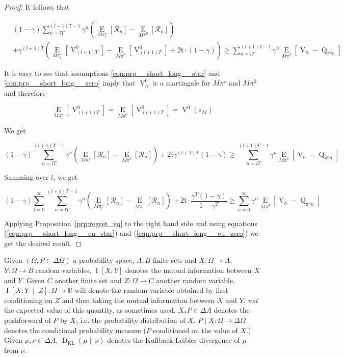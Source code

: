 \documentclass[anon,12pt]{colt2018} %
\newcommand{\Comment}[1]{}
\newcommand{\AP}[1]{\left(#1\right)}
\newcommand{\AB}[1]{\left[#1\right]}
\newcommand{\ABM}[2]{\left[#1\;\middle\vert\;#2\right]}
\newcommand{\Ea}[2]{\underset{#1}{\operatorname{E}}\AB{#2}}
\newcommand{\CI}[3]{\underset{#1}{\operatorname{I}}\ABM{#2}{#3}}
\newcommand{\Ia}[2]{\underset{#1}{\operatorname{I}}\AB{#2}}
\newcommand{\KL}[2]{\operatorname{D}_{\mathrm{KL}}(#1 \| #2)}
\newcommand{\Reals}{\mathbb{R}}
\newcommand{\R}{\mathcal{R}}
\newcommand{\V}{\operatorname{V}}
\newcommand{\Q}{\operatorname{Q}}
\newcommand{\Tn}{\mathfrak{t}}
\begin{document}
\begin{proof}
It follows that

\begin{align*}
&(1-\gamma)\sum_{n=lT}^{(l+1)T-1} {\gamma^n\AP{\Ea{M\pi^\star_l}{\R_n}-\Ea{M\pi^0}{\R_n}}}\\ 
&+ \gamma^{(l+1)T}\AP{\Ea{M\pi^\star_l}{\V^0_{(l+1)T}}-\Ea{M\pi^0}{\V^0_{(l+1)T}}+2\Tn\cdot(1-\gamma)} \geq \sum_{n=lT}^{(l+1)T-1}{\gamma^n \Ea{M\pi^0}{\V_n-\Q_{\pi^0n}}}
\end{align*}

\Comment{Here, an expected value w.r.t. the difference of two probability measures is understood to mean the corresponding difference of expected values.}

It is easy to see that assumptions \ref{con:prp__short_long__star} and \ref{con:prp__short_long__zero} imply that $\V_n^0$ is a martingale for $M\pi^\star$ and $M\pi^0$ and therefore

$$\Ea{M\pi^\star_l}{\V^0_{(l+1)T}}=\Ea{M\pi^0}{\V^0_{(l+1)T}}=\V^0\AP{s_M}$$

We get

\begin{equation*}
(1-\gamma)\sum_{n=lT}^{(l+1)T-1} {\gamma^n\AP{\Ea{M\pi^\star_l}{\R_n}-\Ea{M\pi^0}{\R_n}}}+ 2\Tn\gamma^{(l+1)T}(1-\gamma) \geq \sum_{n=lT}^{(l+1)T-1}{\gamma^n \Ea{M\pi^0}{\V_n-\Q_{\pi^0n}}} 
\end{equation*}

Summing over $l$, we get

\[(1-\gamma)\sum_{l=0}^\infty\sum_{n=lT}^{(l+1)T-1} {\gamma^n\AP{\Ea{M\pi^\star_l}{\R_n}-\Ea{M\pi^0}{\R_n}}}+ 2\Tn\cdot\frac{\gamma^T(1-\gamma)}{1-\gamma^T} \geq \sum_{n=0}^{\infty}{\gamma^n \Ea{M\pi^0}{\V_n-\Q_{\pi^0n}}} \]

Applying Proposition~\ref{prp:regret_vq} to the right hand side and using equations (\ref{eqn:prp__short_long__eu_star}) and (\ref{eqn:prp__short_long__eu_zero}) we get the desired result.
\end{proof}

Given $(\Omega,P\in\Delta\Omega)$ a probability space, $A,B$ finite sets and $X: \Omega \rightarrow A$, $Y: \Omega \rightarrow B$ random variables, $\Ia{}{X;Y}$ denotes the mutual information between $X$ and $Y$. Given $C$ another finite set and $Z: \Omega \rightarrow C$ another random variable, $\CI{}{X;Y}{Z}: \Omega \rightarrow \Reals$ will denote the random variable obtained by first conditioning on $Z$ and then taking the mutual information between $X$ and $Y$, \emph{not} the expected value of this quantity, as sometimes used. $X_*P\in\Delta A$ denotes the pushforward of $P$ by $X$, i.e. the probability distribution of $X$. $P \mid X: \Omega \rightarrow \Delta\Omega$ denotes the conditional probability measure ($P$ conditioned on the value of $X$.) Given $\mu,\nu \in \Delta A$, $\KL{\mu}{\nu}$ denotes the Kullback-Leibler divergence of $\mu$ from $\nu$.
\end{document}
